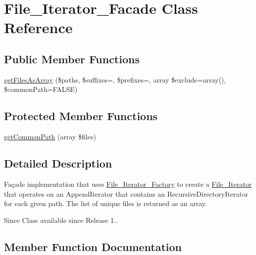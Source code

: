 \hypertarget{class_file___iterator___facade}{}\section{File\+\_\+\+Iterator\+\_\+\+Facade Class Reference}
\label{class_file___iterator___facade}
\subsection*{Public Member Functions}
\begin{DoxyCompactItemize}
\item 
\mbox{\hyperlink{class_file___iterator___facade_aaf81b4c206e070aa94a9d2158adf31be}{get\+Files\+As\+Array}} (\$paths, \$suffixes=\textquotesingle{}\textquotesingle{}, \$prefixes=\textquotesingle{}\textquotesingle{}, array \$exclude=array(), \$common\+Path=F\+A\+L\+SE)
\end{DoxyCompactItemize}
\subsection*{Protected Member Functions}
\begin{DoxyCompactItemize}
\item 
\mbox{\hyperlink{class_file___iterator___facade_a46f1951082151ae12e731f3d2628a2a2}{get\+Common\+Path}} (array \$files)
\end{DoxyCompactItemize}


\subsection{Detailed Description}
Façade implementation that uses \mbox{\hyperlink{class_file___iterator___factory}{File\+\_\+\+Iterator\+\_\+\+Factory}} to create a \mbox{\hyperlink{class_file___iterator}{File\+\_\+\+Iterator}} that operates on an Append\+Iterator that contains an Recursive\+Directory\+Iterator for each given path. The list of unique files is returned as an array.

\begin{DoxySince}{Since}
Class available since Release 1.. 
\end{DoxySince}


\subsection{Member Function Documentation}
\mbox{\label{class_file___iterator___facade_a46f1951082151ae12e731f3d2628a2a2}} 
